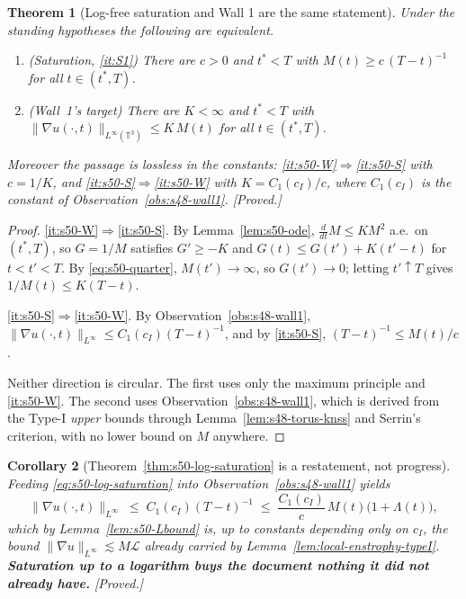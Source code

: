 \documentclass[11pt]{article}
\newtheorem{theorem}{Theorem}[section]
\newtheorem{corollary}[theorem]{Corollary}
\theoremstyle{definition}
\theoremstyle{remark}
\newcommand{\T}{\mathbb{T}}
\begin{document}
\begin{theorem}[Log-free saturation and Wall 1 are the same statement]
  \label{thm:s50-equivalence}
  Under the standing hypotheses the following are equivalent.
  \begin{enumerate}[label=\textup{(\Alph*)},leftmargin=2.6em]
  \item\label{it:s50-S} \textup{(Saturation, \ref{it:S1})} There are
    $c>0$ and $t^*<T$ with $M(t)\geq c\,(T-t)^{-1}$ for all $t\in(t^*,T)$.
  \item\label{it:s50-W} \textup{(Wall~1's target)} There are $K<\infty$ and
    $t^*<T$ with $\|\nabla u(\cdot,t)\|_{L^\infty(\T^3)}\leq K\,M(t)$ for all
    $t\in(t^*,T)$.
  \end{enumerate}
  Moreover the passage is lossless in the constants:
  \ref{it:s50-W}$\Rightarrow$\ref{it:s50-S} with $c=1/K$, and
  \ref{it:s50-S}$\Rightarrow$\ref{it:s50-W} with $K=C_1(c_I)/c$, where
  $C_1(c_I)$ is the constant of Observation~\ref{obs:s48-wall1}.
  \emph{[Proved.]}
\end{theorem}
\begin{proof}
  \ref{it:s50-W}$\Rightarrow$\ref{it:s50-S}. By Lemma~\ref{lem:s50-ode},
  $\frac{d}{dt}M\leq KM^2$ a.e.\ on $(t^*,T)$, so $G=1/M$ satisfies
  $G'\geq-K$ and $G(t)\leq G(t')+K(t'-t)$ for $t<t'<T$. By
  \eqref{eq:s50-quarter}, $M(t')\to\infty$, so $G(t')\to0$; letting
  $t'\uparrow T$ gives $1/M(t)\leq K(T-t)$.

  \ref{it:s50-S}$\Rightarrow$\ref{it:s50-W}. By
  Observation~\ref{obs:s48-wall1},
  $\|\nabla u(\cdot,t)\|_{L^\infty}\leq C_1(c_I)(T-t)^{-1}$, and by
  \ref{it:s50-S}, $(T-t)^{-1}\leq M(t)/c$.

  Neither direction is circular. The first uses only the maximum principle and
  \ref{it:s50-W}. The second uses Observation~\ref{obs:s48-wall1}, which is
  derived from the Type-I \emph{upper} bounds through
  Lemma~\ref{lem:s48-torus-knss} and Serrin's criterion, with no lower bound
  on $M$ anywhere.
\end{proof}

\begin{corollary}[Theorem~\ref{thm:s50-log-saturation} is a restatement, not
  progress]\label{cor:s50-restatement}
  Feeding \eqref{eq:s50-log-saturation} into
  Observation~\ref{obs:s48-wall1} yields
  \[
    \|\nabla u(\cdot,t)\|_{L^\infty}
      \;\leq\; C_1(c_I)(T-t)^{-1}
      \;\leq\; \frac{C_1(c_I)}{c}\,M(t)\bigl(1+\Lambda(t)\bigr),
  \]
  which by Lemma~\ref{lem:s50-Lbound} is, up to constants depending only on
  $c_I$, the bound $\|\nabla u\|_{L^\infty}\lesssim M\mathcal{L}$ already
  carried by Lemma~\ref{lem:local-enstrophy-typeI}. \textbf{Saturation up to a
  logarithm buys the document nothing it did not already have.}
  \emph{[Proved.]}
\end{corollary}
\end{document}
